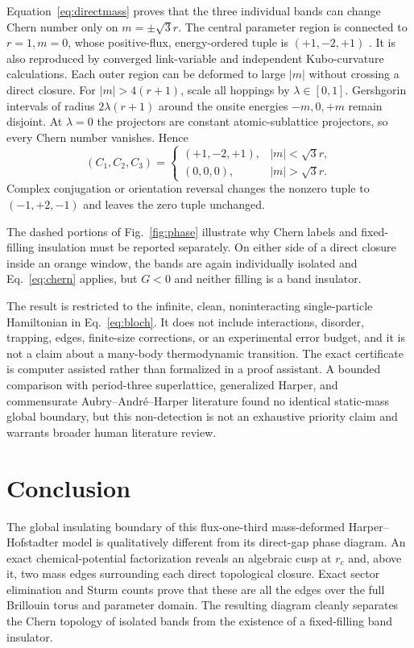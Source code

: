 \documentclass[aps,prb,preprint,superscriptaddress,nofootinbib]{revtex4-2}
\begin{document}
Equation~\eqref{eq:directmass} proves that the three individual bands can
change Chern number only on $m=\pm\sqrt3r$.  The central parameter region is
connected to $r=1,m=0$, whose positive-flux, energy-ordered tuple is
$(+1,-2,+1)$ \cite{Cooper2019}.  It is also reproduced by converged
link-variable and independent Kubo-curvature calculations.  Each outer region
can be deformed to large $|m|$ without crossing a direct closure.  For
$|m|>4(r+1)$, scale all hoppings by $\lambda\in[0,1]$.  Gershgorin intervals
of radius $2\lambda(r+1)$ around the onsite energies $-m,0,+m$ remain
disjoint.  At $\lambda=0$ the projectors are constant atomic-sublattice
projectors, so every Chern number vanishes.  Hence
\begin{equation}
(C_1,C_2,C_3)=
\begin{cases}
(+1,-2,+1),&|m|<\sqrt3r,\\
(0,0,0),&|m|>\sqrt3r.
\end{cases}
\label{eq:chern}
\end{equation}
Complex conjugation or orientation reversal changes the nonzero tuple to
$(-1,+2,-1)$ and leaves the zero tuple unchanged.

The dashed portions of Fig.~\ref{fig:phase} illustrate why Chern labels and
fixed-filling insulation must be reported separately.  On either side of a
direct closure inside an orange window, the bands are again individually
isolated and Eq.~\eqref{eq:chern} applies, but $G<0$ and neither filling is a
band insulator.

The result is restricted to the infinite, clean, noninteracting
single-particle Hamiltonian in Eq.~\eqref{eq:bloch}.  It does not include
interactions, disorder, trapping, edges, finite-size corrections, or an
experimental error budget, and it is not a claim about a many-body
thermodynamic transition.  The exact certificate is computer assisted rather
than formalized in a proof assistant.  A bounded comparison with period-three
superlattice, generalized Harper, and commensurate Aubry--Andr\'e--Harper
literature found no identical static-mass global boundary, but this
non-detection is not an exhaustive priority claim and warrants broader human
literature review.

\section{Conclusion}

The global insulating boundary of this flux-one-third mass-deformed
Harper--Hofstadter model is qualitatively different from its direct-gap phase
diagram.  An exact chemical-potential factorization reveals an algebraic cusp
at $r_c$ and, above it, two mass edges surrounding each direct topological
closure.  Exact sector elimination and Sturm counts prove that these are all
the edges over the full Brillouin torus and parameter domain.  The resulting
diagram cleanly separates the Chern topology of isolated bands from the
existence of a fixed-filling band insulator.
\end{document}
